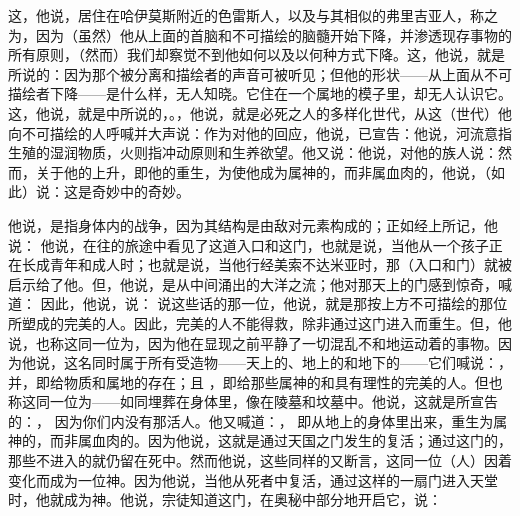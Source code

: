 这，他说，居住在哈伊莫斯附近的色雷斯人，以及与其相似的弗里吉亚人，称之为，因为（虽然）他从上面的首脑和不可描绘的脑髓开始下降，并渗透现存事物的所有原则，（然而）我们却察觉不到他如何以及以何种方式下降。这，他说，就是所说的：因为那个被分离和描绘者的声音可被听见；但他的形状——从上面从不可描绘者下降——是什么样，无人知晓。它住在一个属地的模子里，却无人认识它。这，他说，就是中所说的，。，他说，就是必死之人的多样化世代，从这（世代）他向不可描绘的人呼喊并大声说：作为对他的回应，他说，已宣告：他说，河流意指生殖的湿润物质，火则指冲动原则和生养欲望。他又说：他说，对他的族人说：然而，关于他的上升，即他的重生，为使他成为属神的，而非属血肉的，他说，（如此）说：这是奇妙中的奇妙。\par

他说，是指身体内的战争，因为其结构是由敌对元素构成的；正如经上所记，他说： 他说，在往的旅途中看见了这道入口和这门，也就是说，当他从一个孩子正在长成青年和成人时；也就是说，当他行经美索不达米亚时，那（入口和门）就被启示给了他。但，他说，是从中间涌出的大洋之流；他对那天上的门感到惊奇，喊道： 因此，他说，说：  说这些话的那一位，他说，就是那按上方不可描绘的那位所塑成的完美的人。因此，完美的人不能得救，除非通过这门进入而重生。但，他说，也称这同一位为，因为他在显现之前平静了一切混乱不和地运动着的事物。因为他说，这名同时属于所有受造物——天上的、地上的和地下的——它们喊说：，并，即给物质和属地的存在；且 ，即给那些属神的和具有理性的完美的人。但也称这同一位为——如同埋葬在身体里，像在陵墓和坟墓中。他说，这就是所宣告的：， 因为你们内没有那活人。他又喊道：， 即从地上的身体里出来，重生为属神的，而非属血肉的。因为他说，这就是通过天国之门发生的复活；通过这门的，那些不进入的就仍留在死中。然而他说，这些同样的又断言，这同一位（人）因着变化而成为一位神。因为他说，当他从死者中复活，通过这样的一扇门进入天堂时，他就成为神。他说，宗徒知道这门，在奥秘中部分地开启它，说： \par

